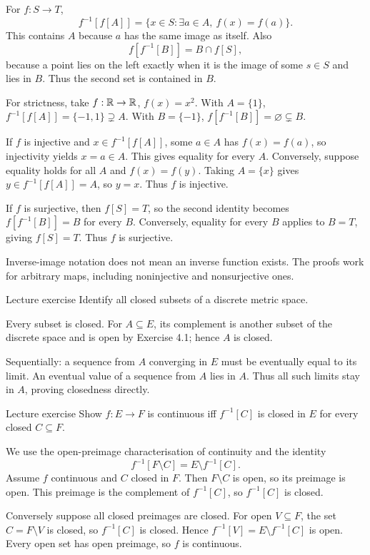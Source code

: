 \begin{answer}
For $f:S\to T$,
\[f^{-1}[f[A]]=\{x\in S:\exists a\in A,\ f(x)=f(a)\}.
\]
This contains $A$ because $a$ has the same image as itself. Also
\[f[f^{-1}[B]]=B\cap f[S],\]
because a point lies on the left exactly when it is the image of some $s\in S$ and lies in $B$. Thus the second set is contained in $B$.

For strictness, take $f:\mathbb R\to\mathbb R$, $f(x)=x^2$. With $A=\{1\}$, $f^{-1}[f[A]]=\{-1,1\}\supsetneq A$. With $B=\{-1\}$, $f[f^{-1}[B]]=\varnothing\subsetneq B$.

If $f$ is injective and $x\in f^{-1}[f[A]]$, some $a\in A$ has $f(x)=f(a)$, so injectivity yields $x=a\in A$. This gives equality for every $A$. Conversely, suppose equality holds for all $A$ and $f(x)=f(y)$. Taking $A=\{x\}$ gives $y\in f^{-1}[f[A]]=A$, so $y=x$. Thus $f$ is injective.

If $f$ is surjective, then $f[S]=T$, so the second identity becomes $f[f^{-1}[B]]=B$ for every $B$. Conversely, equality for every $B$ applies to $B=T$, giving $f[S]=T$. Thus $f$ is surjective.
\end{answer}
\begin{tip}
Inverse-image notation does not mean an inverse function exists. The proofs work for arbitrary maps, including noninjective and nonsurjective ones.
\end{tip}
\begin{exam}{Lecture exercise}
Identify all closed subsets of a discrete metric space.
\end{exam}
\begin{answer}
Every subset is closed. For $A\subseteq E$, its complement is another subset of the discrete space and is open by Exercise 4.1; hence $A$ is closed.

Sequentially: a sequence from $A$ converging in $E$ must be eventually equal to its limit. An eventual value of a sequence from $A$ lies in $A$. Thus all such limits stay in $A$, proving closedness directly.
\end{answer}
\begin{exam}{Lecture exercise}
Show $f:E\to F$ is continuous iff $f^{-1}[C]$ is closed in $E$ for every closed $C\subseteq F$.
\end{exam}
\begin{answer}
We use the open-preimage characterisation of continuity and the identity
\[f^{-1}[F\setminus C]=E\setminus f^{-1}[C].\]
Assume $f$ continuous and $C$ closed in $F$. Then $F\setminus C$ is open, so its preimage is open. This preimage is the complement of $f^{-1}[C]$, so $f^{-1}[C]$ is closed.

Conversely suppose all closed preimages are closed. For open $V\subseteq F$, the set $C=F\setminus V$ is closed, so $f^{-1}[C]$ is closed. Hence $f^{-1}[V]=E\setminus f^{-1}[C]$ is open. Every open set has open preimage, so $f$ is continuous.
\end{answer}
